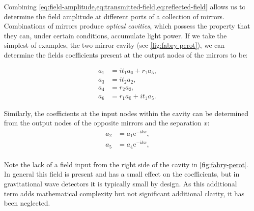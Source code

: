 Combining \cref{eq:field-amplitude,eq:transmitted-field,eq:reflected-field} allows us to determine the field amplitude at different ports of a collection of mirrors. Combinations of mirrors produce \emph{optical cavities}, which possess the property that they can, under certain conditions, accumulate light power. If we take the simplest of examples, the two-mirror \FP{} cavity (see \cref{fig:fabry-perot}), we can determine the fields coefficients present at the output nodes of the mirrors to be:

\begin{equation}
  \label{eq:fabry-perot-coefficients-1}
  \begin{split}
    a_1 &= it_1 a_0 + r_1 a_5, \\
    a_3 &= it_2 a_2, \\
    a_4 &= r_2 a_2, \\
    a_6 &= r_1 a_0 + it_1 a_5.
  \end{split}
\end{equation}

Similarly, the coefficients at the input nodes within the cavity can be determined from the output nodes of the opposite mirrors and the separation $x$:
\begin{equation}
  \label{eq:fabry-perot-coefficients-2}
  \begin{split}
    a_2 &= a_1 \text{e}^{-\text{i} kx}, \\
    a_5 &= a_4 \text{e}^{-\text{i} kx}, \\
  \end{split}
\end{equation}

Note the lack of a field input from the right side of the cavity in \cref{fig:fabry-perot}. In general this field is present and has a small effect on the coefficients, but in gravitational wave detectors it is typically small by design. As this additional term adds mathematical complexity but not significant additional clarity, it has been neglected.

